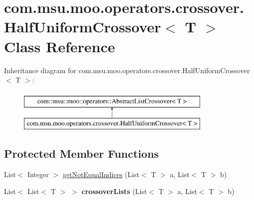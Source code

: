 \hypertarget{classcom_1_1msu_1_1moo_1_1operators_1_1crossover_1_1HalfUniformCrossover_3_01T_01_4}{\section{com.\-msu.\-moo.\-operators.\-crossover.\-Half\-Uniform\-Crossover$<$ T $>$ Class Reference}
\label{classcom_1_1msu_1_1moo_1_1operators_1_1crossover_1_1HalfUniformCrossover_3_01T_01_4}
}
Inheritance diagram for com.\-msu.\-moo.\-operators.\-crossover.\-Half\-Uniform\-Crossover$<$ T $>$\-:\begin{figure}[H]
\begin{center}
\leavevmode
\includegraphics[height=2.000000cm]{classcom_1_1msu_1_1moo_1_1operators_1_1crossover_1_1HalfUniformCrossover_3_01T_01_4}
\end{center}
\end{figure}
\subsection*{Protected Member Functions}
\begin{DoxyCompactItemize}
\item 
List$<$ Integer $>$ \hyperlink{classcom_1_1msu_1_1moo_1_1operators_1_1crossover_1_1HalfUniformCrossover_3_01T_01_4_af0ecb25efc748432acac34064f146b9a}{get\-Not\-Equal\-Indices} (List$<$ T $>$ a, List$<$ T $>$ b)
\item 
\hypertarget{classcom_1_1msu_1_1moo_1_1operators_1_1crossover_1_1HalfUniformCrossover_3_01T_01_4_acbc99967d8180a9ed309686b54f418dd}{List$<$ List$<$ T $>$ $>$ {\bfseries crossover\-Lists} (List$<$ T $>$ a, List$<$ T $>$ b)}\label{classcom_1_1msu_1_1moo_1_1operators_1_1crossover_1_1HalfUniformCrossover_3_01T_01_4_acbc99967d8180a9ed309686b54f418dd}

\end{DoxyCompactItemize}


